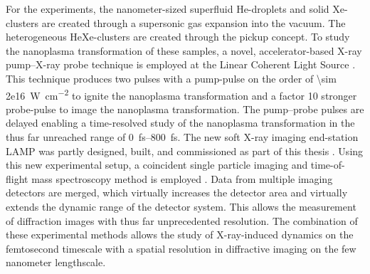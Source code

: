For the experiments, the nanometer-sized superfluid He-droplets and solid Xe-clusters are created through a supersonic gas expansion into the vacuum. The heterogeneous HeXe-clusters are created through the pickup concept. To study the nanoplasma transformation of these samples, a novel, accelerator-based X-ray pump--X-ray probe technique is employed at the Linear Coherent Light Source \cite{Lutman-2013-PRL}. This technique produces two pulses with a pump-pulse on the order of \SI{\sim 2e16}{\watt\per\square\centi\meter} to ignite the nanoplasma transformation and a factor 10 stronger probe-pulse to image the nanoplasma transformation. The pump--probe pulses are delayed enabling a time-resolved study of the nanoplasma transformation in the thus far unreached range of \SIrange{0}{800}{\femto\second}. The new soft X-ray imaging end-station LAMP was partly designed, built, and commissioned as part of this thesis \citep{Ferguson-2015-JSR}. Using this new experimental setup, a coincident single particle imaging and time-of-flight mass spectroscopy method is employed \cite{Gorkhover-2012-PRL}. Data from multiple imaging detectors are merged, which virtually increases the detector area and virtually extends the dynamic range of the detector system. This allows the measurement of diffraction images with thus far unprecedented resolution. The combination of these experimental methods allows the study of X-ray-induced dynamics on the femtosecond timescale with a spatial resolution in diffractive imaging on the few nanometer lengthscale.\\[1\baselineskip]
%
